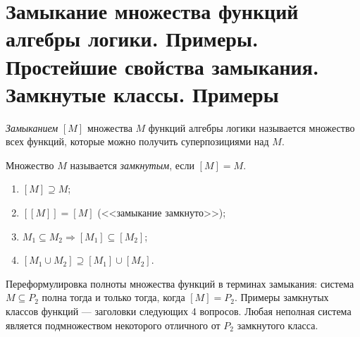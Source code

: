 \section{Замыкание множества функций алгебры логики. Примеры. Простейшие свойства замыкания. Замкнутые классы. Примеры}

\begin{definition}
    \textit{Замыканием} $[M]$ множества $M$ функций алгебры логики называется множество всех функций, которые можно получить суперпозициями над $M$.
\end{definition}

\begin{definition}
    Множество $M$ называется \textit{замкнутым}, если $[M] = M$.
\end{definition}

\begin{proposal}
    \begin{enumerate}[nolistsep]
        \item $[M] \supseteq M$;
        \item $[[M]] = [M]$ (<<замыкание замкнуто>>);
        \item $M_1 \subseteq M_2 \Rightarrow [M_1] \subseteq [M_2]$;
        \item $[M_1 \cup M_2] \supseteq [M_1] \cup [M_2]$.
    \end{enumerate}
\end{proposal}

Переформулировка полноты множества функций в терминах замыкания: система $M \subseteq P_2$ полна тогда и только тогда, когда $[M] = P_2$. Примеры замкнутых классов функций --- заголовки следующих 4 вопросов. Любая неполная система является подмножеством некоторого отличного от $P_2$ замкнутого класса.

